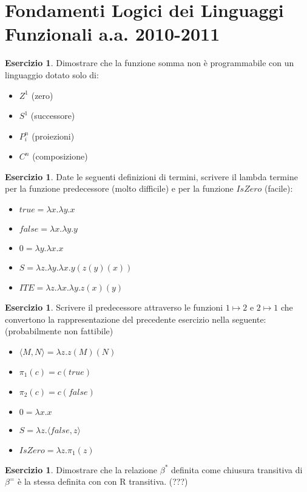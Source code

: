 \documentclass[oneside]{amsart}
\numberwithin{equation}{section}
\numberwithin{figure}{section}
\theoremstyle{plain}
\theoremstyle{definition}
\newtheorem{xca}[thm]{Esercizio}
\begin{document}
\section*{Fondamenti Logici dei Linguaggi Funzionali a.a. 2010-2011}

\begin{xca}
Dimostrare che la funzione somma non è programmabile con un linguaggio dotato solo di:
\begin{itemize}
\item $Z^{1}$ (zero)
\item $S^{1}$ (successore)
\item $P_{i}^{n}$ (proiezioni)
\item $C^{n}$ (composizione)
\end{itemize}
\end{xca}

\begin{xca}
Date le seguenti definizioni di termini, scrivere il lambda termine
per la funzione predecessore (molto difficile) e per la funzione $IsZero$ (facile):
\begin{itemize}
\item $true = \lambda x.\lambda y.x $
\item $false = \lambda x.\lambda y.y $
\item $0 = \lambda y.\lambda x.x $
\item $S = \lambda z.\lambda y.\lambda x.y(z(y)(x)) $
\item $ITE = \lambda z.\lambda x.\lambda y.z(x)(y)$
\end{itemize}
\end{xca}

\begin{xca}
Scrivere il predecessore attraverso le funzioni $1 \mapsto 2$ e $2 \mapsto 1$ che
convertono la rappresentazione del precedente esercizio nella seguente: (probabilmente
non fattibile)
\begin{itemize}
\item $\langle M,N\rangle={\lambda}z.z(M)(N)$
\item $\pi_{1}(c)=c(true)$
\item $\pi_{2}(c)=c(false)$
\item $0={\lambda}x.x$
\item $S={\lambda}z.\langle false,z\rangle$
\item $IsZero={\lambda}z.\pi_{1}(z)$
\end{itemize}
\end{xca}

\begin{xca}
Dimostrare che la relazione $\beta^{*}$ definita come chiusura transitiva
di $\beta^{=}$ è la stessa definita con con R transitiva. (???)
\end{xca}
\end{document}
